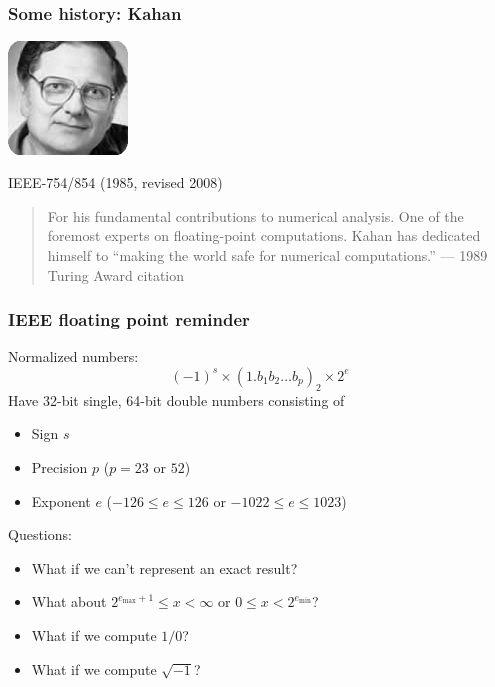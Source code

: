 \documentclass{beamer}
\begin{document}
\begin{frame}
  \frametitle{Some history: Kahan}
  
  \begin{center}
    \includegraphics[height=3cm]{figs/kahan.jpg}

    IEEE-754/854 (1985, revised 2008)
  \end{center}

  \begin{quote}
    For his fundamental contributions to numerical analysis. One of
    the foremost experts on floating-point computations. Kahan has
    dedicated himself to ``making the world safe for numerical
    computations.''
    \hfill --- 1989 Turing Award citation
  \end{quote}
\end{frame}


\begin{frame}
  \frametitle{IEEE floating point reminder}

  Normalized numbers:
  \[
    (-1)^s \times (1.b_1 b_2 \ldots b_p)_2 \times 2^e
  \]
  Have 32-bit single, 64-bit double numbers consisting of
  \begin{itemize}
  \item Sign $s$
  \item Precision $p$ ($p = 23$ or $52$)
  \item Exponent $e$ ($-126 \leq e \leq 126$ or $-1022 \leq e \leq 1023$)
  \end{itemize}

  \vspace{5mm}
  Questions:
  \begin{itemize}
  \item What if we can't represent an exact result?
  \item What about $2^{e_{\max}+1} \leq x < \infty$ or $0 \leq x < 2^{e_{\min}}$?
  \item What if we compute $1/0$?
  \item What if we compute $\sqrt{-1}$?
  \end{itemize}
\end{frame}
\end{document}
